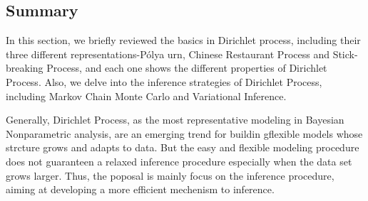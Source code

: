 	\subsection{Summary}
	
	In this section, we briefly reviewed the basics in Dirichlet process, including their three different representations-P\'{o}lya urn, Chinese Restaurant Process and Stick-breaking Process, and each one shows the different properties of Dirichlet Process. Also, we delve into the inference strategies of Dirichlet Process, including Markov Chain Monte Carlo and Variational Inference. 
   
    Generally, Dirichlet Process, as the most representative modeling in Bayesian Nonparametric analysis, are an emerging trend for buildin gflexible models whose strcture grows and adapts to data. But the easy and flexible modeling procedure does not guaranteen a relaxed inference procedure especially when the data set grows larger. Thus, the poposal is mainly focus on the inference procedure, aiming at developing a more efficient mechenism to inference.  